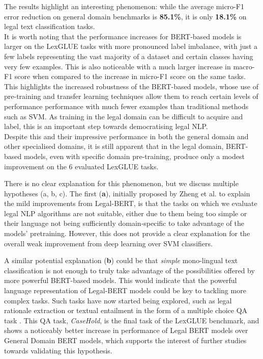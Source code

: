 \documentclass{IOS-Book-Article}
\begin{document}
The results highlight an interesting phenomenon: while the average micro-F1 error reduction on general domain benchmarks is \textbf{85.1\%}, it is only \textbf{18.1\%} on legal text classification tasks.\\
It is worth noting that the performance increases for BERT-based models is larger on the LexGLUE tasks with more pronounced label imbalance, with just a few labels representing the vast majority of a dataset and certain classes having very few examples. This is also noticeable with a much larger increase in macro-F1 score when compared to the increase in micro-F1 score on the same tasks. This highlights the increased robustness of the BERT-based models, whose use of pre-training and transfer learning techniques allow them to reach certain levels of performance performance with much fewer examples than traditional methods such as SVM. As training in the legal domain can be difficult to acquire and label, this is an important step towards democratising legal NLP.\\

Despite this and their impressive performance in both the general domain and other specialised domains, it is still apparent that in the legal domain, BERT-based models, even with specific domain pre-training, produce only a modest improvement on the 6 evaluated LexGLUE tasks.

There is no clear explanation for this phenomenon, but we discuss multiple hypotheses (a, b, c).
The first (\textbf{a}), initially proposed by Zheng et al. \cite{legalberticail} to explain the mild improvements from Legal-BERT, is that the tasks on which we evaluate legal NLP algorithms are not suitable, either due to them being too simple or their language not being sufficiently domain-specific to take advantage of the models' pretraining. However, this does not provide a clear explanation for the overall weak improvement from deep learning over SVM classifiers. 

A similar potential explanation (\textbf{b}) could be that \textit{simple} mono-lingual text classification is not enough to truly take advantage of the possibilities offered by more powerful BERT-based models. This would indicate that the powerful language representation of Legal-BERT models could be key to tackling more complex tasks. Such tasks have now started being explored, such as legal rationale extraction \cite{rationale} or textual entailment in the form of a multiple choice QA task \cite{legalberticail}. This QA task, \textit{CaseHold}, is the final task of the LexGLUE benchmark, and shows a noticeably better increase in performance of Legal BERT models over General Domain BERT models, which supports the interest of further studies towards validating this hypothesis.
\end{document}
